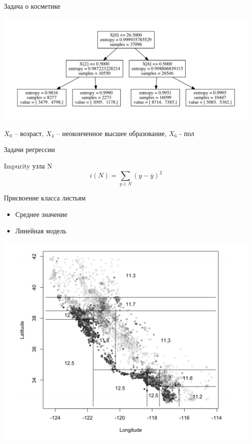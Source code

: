 \documentclass[10pt]{beamer}
\begin{document}

\begin{frame}{Задача о косметике}

\begin{center}
\includegraphics[scale=0.45]{images/model.pdf}
\end{center}

$X_0$ -- возраст, $X_4$ -- неоконченное высшее образование, $X_6$ - пол

\end{frame}


\begin{frame}{Задачи регрессии}

Impurity узла N
\[
i(N) = \sum_{y \in N} (y - \overline{y})^2
\]

Присвоение класса листьям
\begin{itemize}
\item Среднее значение
\item Линейная модель
\end{itemize}

\includegraphics[scale=0.4]{images/housing.png}

\end{frame}
\end{document}
